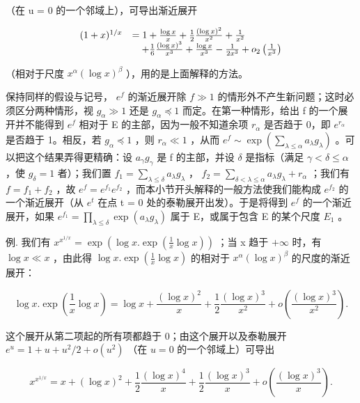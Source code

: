 （在 u = 0 的一个邻域上），可导出渐近展开

\[
\begin{array}{r l} (1 + x) ^ {1 / x} & = 1 + \frac {\log x}{x} + \frac {1}{2} \frac {(\log x) ^ {2}}{x ^ {2}} + \frac {1}{x ^ {2}} \\ & \quad + \frac {1}{6} \frac {(\log x) ^ {3}}{x ^ {3}} + \frac {\log x}{x ^ {3}} - \frac {1}{2 x ^ {3}} + o _ {2} \left(\frac {1}{x ^ {3}}\right) \end{array}
\]

（相对于尺度 \(x^{\alpha}(\log x)^{\beta}\) ），用的是上面解释的方法。

保持同样的假设与记号， \(e^{f}\) 的渐近展开除 \(f \gg 1\) 的情形外不产生新问题；这时必须区分两种情形，视 \(g_{\alpha} \gg 1\) 还是 \(g_{\alpha} \preccurlyeq 1\) 而定。在第一种情形，给出 f 的一个展开并不能得到 \(e^{f}\) 相对于 E 的主部，因为一般不知道余项 \(r_{\alpha}\) 是否趋于 0，即 \(e^{r_{\alpha}}\) 是否趋于 1。相反，若 \(g_{\alpha} \preccurlyeq 1\) ，则 \(r_{\alpha} \ll 1\) ，从而 \(e^{f} \sim \exp\left(\sum_{\lambda \leqslant \alpha} a_{\lambda} g_{\lambda}\right)\) 。可以把这个结果弄得更精确：设 \(a_{\gamma} g_{\gamma}\) 是 f 的主部，并设 \(\delta\) 是指标（满足 \(\gamma < \delta \leqslant \alpha\) ，使 \(g_{\delta} = 1\) 者）；我们置 \(f_{1} = \sum_{\lambda \leqslant \delta} a_{\lambda} g_{\lambda}\) ， \(f_{2} = \sum_{\delta < \lambda \leqslant \alpha} a_{\lambda} g_{\lambda} + r_{\alpha}\) ；我们有 \(f = f_{1} + f_{2}\) ，故 \(e^{f} = e^{f_{1}} e^{f_{2}}\) ，而本小节开头解释的一般方法使我们能构成 \(e^{f_{2}}\) 的一个渐近展开（从 \(e^{t}\) 在点 t = 0 处的泰勒展开出发）。于是将得到 \(e^{f}\) 的一个渐近展开，如果 \(e^{f_{1}} = \prod_{\lambda \leqslant \delta} \exp(a_{\lambda} g_{\lambda})\) 属于 E，或属于包含 E 的某个尺度 \(E_{1}\) 。

例. 我们有 \(x^{x^{1/x}} = \exp\left(\log x. \exp\left(\frac{1}{x} \log x\right)\right)\) ；当 x 趋于 \(+\infty\) 时，有 \(\log x \ll x\) ，由此得 \(\log x. \exp\left(\frac{1}{x} \log x\right)\) 的相对于 \(x^{\alpha}(\log x)^{\beta}\) 的尺度的渐近展开：

\[
\log x. \exp \left(\frac {1}{x} \log x\right) = \log x + \frac {(\log x) ^ {2}}{x} + \frac {1}{2} \frac {(\log x) ^ {3}}{x ^ {2}} + o \left(\frac {(\log x) ^ {3}}{x ^ {2}}\right).
\]

这个展开从第二项起的所有项都趋于 0；由这个展开以及泰勒展开 \(e^u = 1 + u + u^2 / 2 + o(u^2)\) （在 \(u = 0\) 的一个邻域上）可导出

\[
x ^ {x ^ {1 / x}} = x + (\log x) ^ {2} + \frac {1}{2} \frac {(\log x) ^ {4}}{x} + \frac {1}{2} \frac {(\log x) ^ {3}}{x} + o \left(\frac {(\log x) ^ {3}}{x}\right).
\]

